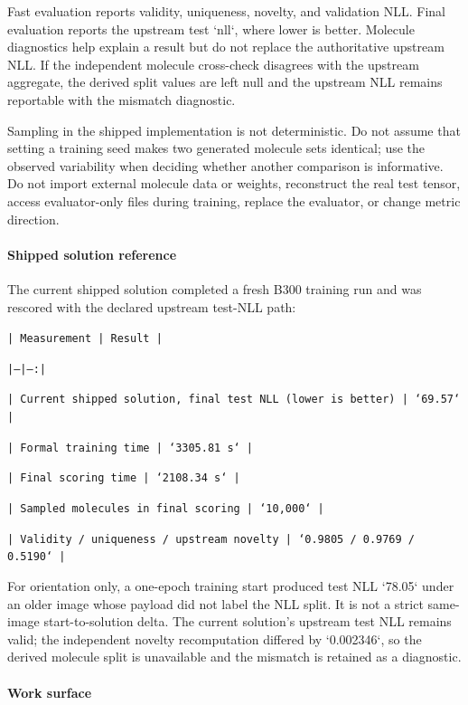 Fast evaluation reports validity, uniqueness, novelty, and validation NLL. Final evaluation reports the upstream test `nll`, where lower is better. Molecule diagnostics help explain a result but do not replace the authoritative upstream NLL. If the independent molecule cross-check disagrees with the upstream aggregate, the derived split values are left null and the upstream NLL remains reportable with the mismatch diagnostic.

Sampling in the shipped implementation is not deterministic. Do not assume that setting a training seed makes two generated molecule sets identical; use the observed variability when deciding whether another comparison is informative. Do not import external molecule data or weights, reconstruct the real test tensor, access evaluator-only files during training, replace the evaluator, or change metric direction.

\paragraph{Shipped solution reference}

The current shipped solution completed a fresh B300 training run and was rescored with the declared upstream test-NLL path:

\texttt{\small | Measurement | Result |}\par
\texttt{\small |---|---:|}\par
\texttt{\small | Current shipped solution, final test NLL (lower is better) | `69.57` |}\par
\texttt{\small | Formal training time | `3305.81 s` |}\par
\texttt{\small | Final scoring time | `2108.34 s` |}\par
\texttt{\small | Sampled molecules in final scoring | `10,000` |}\par
\texttt{\small | Validity / uniqueness / upstream novelty | `0.9805 / 0.9769 / 0.5190` |}\par

For orientation only, a one-epoch training start produced test NLL `78.05` under an older image whose payload did not label the NLL split. It is not a strict same-image start-to-solution delta. The current solution's upstream test NLL remains valid; the independent novelty recomputation differed by `0.002346`, so the derived molecule split is unavailable and the mismatch is retained as a diagnostic.

\paragraph{Work surface}

